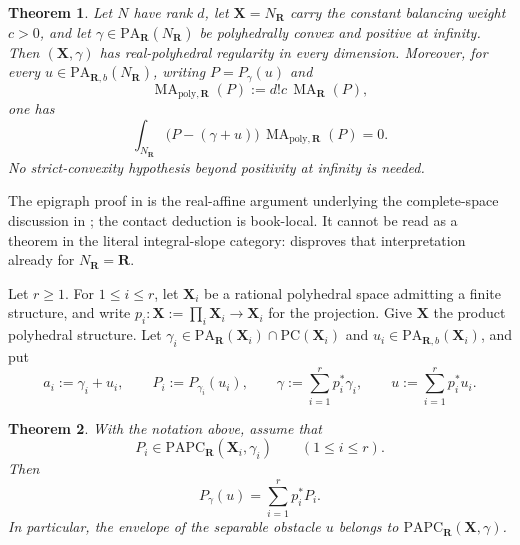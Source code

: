 \documentclass[11pt,a4paper]{article}
\newtheorem{theorem}{Theorem}[section]
\theoremstyle{definition}
\theoremstyle{remark}
\DeclareMathOperator{\MA}{MA}
\begin{document}
\begin{theorem}\label{thm:frontier-polyhedral-affine-orthogonality}
Let \(N\) have rank \(d\), let
\(\mathbf X=N_{\mathbf R}\) carry the constant balancing weight
\(c>0\), and let
\(\gamma\in\mathrm{PA}_{\mathbf R}(N_{\mathbf R})\) be polyhedrally
convex and positive at infinity.  Then
\((\mathbf X,\gamma)\) has real-polyhedral regularity in every dimension.
Moreover, for every \(u\in\mathrm{PA}_{\mathbf R,b}(N_{\mathbf R})\),
writing \(P=P_\gamma(u)\) and
\[
             \MA_{\mathrm{poly},\mathbf R}(P)
             :=d!c\,\MA_{\mathbf R}(P),
\]
one has
\[
 \int_{N_{\mathbf R}}
 \bigl(P-(\gamma+u)\bigr)\,
 \MA_{\mathrm{poly},\mathbf R}(P)=0.
\]
No strict-convexity hypothesis beyond positivity at infinity is needed.
\end{theorem}



The epigraph proof in 
is the real-affine argument underlying the complete-space discussion in
\cite[Remark~6.6]{BMPS26}; the contact deduction is book-local.  It cannot
be read as a theorem in the literal integral-slope category:
 disproves
that interpretation already for \(N_{\mathbf R}=\mathbf R\).



Let $r\geq1$.  For $1\leq i\leq r$, let $\mathbf X_i$ be a rational
polyhedral space admitting a finite structure, and write
$p_i:\mathbf X:=\prod_i\mathbf X_i\to\mathbf X_i$ for the projection.  Give
$\mathbf X$ the product polyhedral structure.  Let
$\gamma_i\in\mathrm{PA}_{\mathbf R}(\mathbf X_i)\cap
\mathrm{PC}(\mathbf X_i)$ and
$u_i\in\mathrm{PA}_{\mathbf R,b}(\mathbf X_i)$, and put
\[
 a_i:=\gamma_i+u_i,
 \qquad
 P_i:=P_{\gamma_i}(u_i),
 \qquad
 \gamma:=\sum_{i=1}^r p_i^*\gamma_i,
 \qquad
 u:=\sum_{i=1}^r p_i^*u_i.
\]

\begin{theorem}
\label{thm:frontier-polyhedral-separable-product-envelope}
With the notation above, assume that
\[
 P_i\in
 \mathrm{PAPC}_{\mathbf R}(\mathbf X_i,\gamma_i)
 \qquad(1\leq i\leq r).
\]
Then
\[
 P_\gamma(u)=\sum_{i=1}^r p_i^*P_i.
 \tag{*}\label{eq:frontier-polyhedral-separable-product-envelope}
\]
In particular, the envelope of the separable obstacle $u$ belongs to
$\mathrm{PAPC}_{\mathbf R}(\mathbf X,\gamma)$.
\end{theorem}
\end{document}
